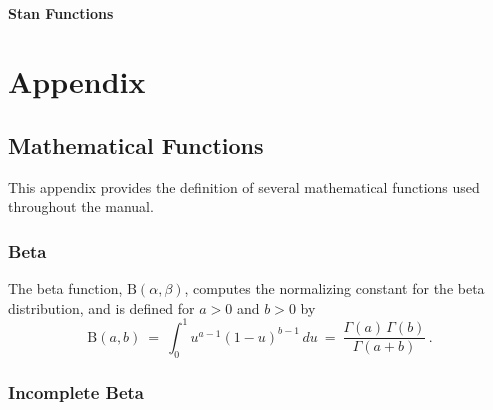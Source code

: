 \begin{description}
{\begin{description}
{


\subsection{Stan Functions}


\begin{description}  \end{description}


\begin{description}  \end{description}


\part{Appendix}


\chapter{Mathematical Functions}\label{math-functions.appendix}


This appendix provides the definition of several mathematical functions used throughout the manual.


\section{Beta}\label{beta-appendix.section}


The beta function, $\text{B}(\alpha,\beta)$, computes the normalizing constant for the beta distribution, and is defined for $a > 0$ and $b > 0$ by \[ \text{B}(a,b) \ = \ \int_0^1 u^{a - 1} (1 - u)^{b - 1} \, du \ = \ \frac{\Gamma(a) \, \Gamma(b)}{\Gamma(a+b)} \, . \] 

\section{Incomplete Beta}\label{inc-beta-appendix.section}


}
\end{description}}
\end{description}
